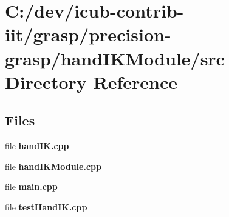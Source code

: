 \section{C\+:/dev/icub-\/contrib-\/iit/grasp/precision-\/grasp/hand\+I\+K\+Module/src Directory Reference}
\label{dir_42770607c53a71cb5927aec33c7cba76}
\subsection*{Files}
\begin{DoxyCompactItemize}
\item 
file {\bfseries hand\+I\+K.\+cpp}
\item 
file {\bfseries hand\+I\+K\+Module.\+cpp}
\item 
file {\bfseries main.\+cpp}
\item 
file {\bfseries test\+Hand\+I\+K.\+cpp}
\end{DoxyCompactItemize}
